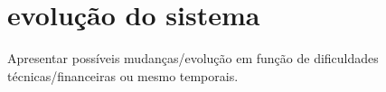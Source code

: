 \chapter{evoluç\~ao do sistema}

Apresentar poss\'iveis mudanças/evoluç\~ao em funç\~ao de dificuldades t\'ecnicas/financeiras ou mesmo temporais.